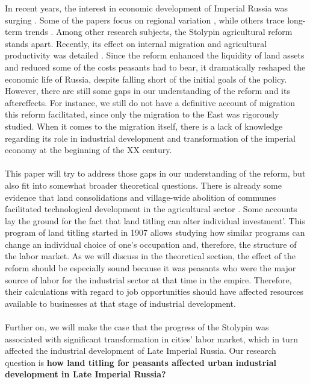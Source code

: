 \documentclass[a4paper, 12pt]{article}
\begin{document}
In recent years, the interest in economic development of Imperial Russia was surging \parencite{gur2021}. Some of the papers focus on regional variation \parencite{markevich2019regional}, while others trace long-term trends \parencite{markevich2018economic, markevich2011great}. Among other research subjects, the Stolypin agricultural reform stands apart. Recently, its effect on internal migration and agricultural productivity was detailed \parencite{chernina2014property, castaneda2019stolypin}. Since the reform enhanced the liquidity of land assets and reduced some of the costs peasants had to bear,  it dramatically reshaped the economic life of Russia, despite falling short of the initial goals of the policy. However, there are still some gaps in our understanding of the reform and its aftereffects. For instance, we still do not have a definitive account of migration this reform facilitated, since only the migration to the East was rigorously studied. When it comes to the migration itself, there is a lack of knowledge regarding its role in industrial development and transformation of the imperial economy at the beginning of the XX century. 
\\\\
This paper will try to address those gaps in our understanding of the reform, but also fit into somewhat broader theoretical questions. There is already some evidence that land consolidations and village-wide abolition of communes facilitated technological development in the agricultural sector \parencite{castaneda2019stolypin}. Some accounts lay the ground for the fact that land titling can alter individual investment'.  This program of land titling started in 1907 allows studying how similar programs can change an individual choice of one's occupation and, therefore, the structure of the labor market. As we will discuss in the theoretical section, the effect of the reform should be especially sound because it was peasants who were the major source of labor for the industrial sector at that time in the empire. Therefore, their calculations with regard to job opportunities should have affected resources available to businesses at that stage of industrial development.
\\\\
Further on, we will make the case that the progress of the Stolypin was associated with significant transformation in cities' labor market, which in turn affected the industrial development of Late Imperial Russia. Our research question is \textbf{how land titling for peasants affected urban industrial development in Late Imperial Russia?}
\end{document}

